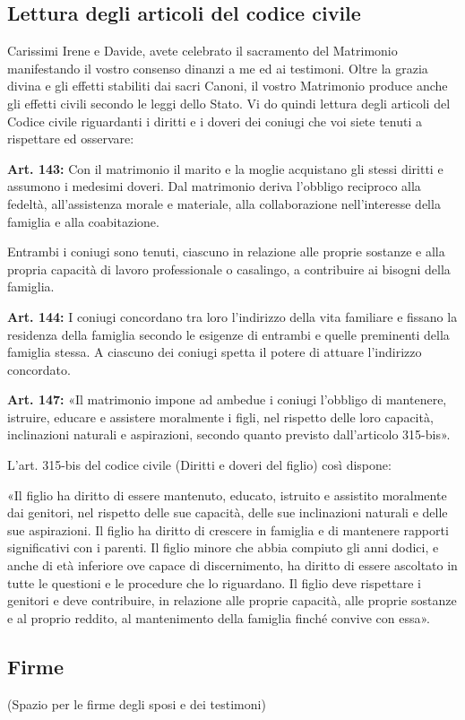 \newpage
\subsection*{Lettura degli articoli del codice civile}

	\begin{dialoghi}
		\item[\sacerdote] Carissimi Irene e Davide, avete celebrato il sacramento del Matrimonio manifestando il vostro consenso dinanzi a me ed ai testimoni. Oltre la grazia divina e gli effetti stabiliti dai sacri Canoni, il vostro Matrimonio produce anche gli effetti civili secondo le leggi dello Stato. Vi do quindi lettura degli articoli del Codice civile riguardanti i diritti e i doveri dei coniugi che voi siete tenuti a rispettare ed osservare:

		\textbf{Art. 143:} Con il matrimonio il marito e la moglie acquistano gli stessi diritti e assumono i medesimi doveri. Dal matrimonio deriva l'obbligo reciproco alla fedeltà, all'assistenza morale e materiale, alla collaborazione nell'interesse della famiglia e alla coabitazione.

		Entrambi i coniugi sono tenuti, ciascuno in relazione alle proprie sostanze e alla propria capacità di lavoro professionale o casalingo, a contribuire ai bisogni della famiglia.

		\textbf{Art. 144:} I coniugi concordano tra loro l'indirizzo della vita familiare e fissano la residenza della famiglia secondo le esigenze di entrambi e quelle preminenti della famiglia stessa. A ciascuno dei coniugi spetta il potere di attuare l'indirizzo concordato.

		\textbf{Art. 147:} «Il matrimonio impone ad ambedue i coniugi l'obbligo di mantenere, istruire, educare e assistere moralmente i figli, nel rispetto delle loro capacità, inclinazioni naturali e aspirazioni, secondo quanto previsto dall'articolo 315-bis».

		L'art. 315-bis del codice civile (Diritti e doveri del figlio) così dispone:

		«Il figlio ha diritto di essere mantenuto, educato, istruito e assistito moralmente dai genitori, nel rispetto delle sue capacità, delle sue inclinazioni naturali e delle sue aspirazioni. Il figlio ha diritto di crescere in famiglia e di mantenere rapporti significativi con i parenti. Il figlio minore che abbia compiuto gli anni dodici, e anche di età inferiore ove capace di discernimento, ha diritto di essere ascoltato in tutte le questioni e le procedure che lo riguardano. Il figlio deve rispettare i genitori e deve contribuire, in relazione alle proprie capacità, alle proprie sostanze e al proprio reddito, al mantenimento della famiglia finché convive con essa».
	\end{dialoghi}

\subsection*{Firme}

	\begin{dialoghi}
		\item[\sacerdote] (Spazio per le firme degli sposi e dei testimoni)
	\end{dialoghi}